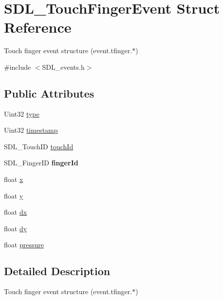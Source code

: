 \hypertarget{struct_s_d_l___touch_finger_event}{}\section{S\+D\+L\+\_\+\+Touch\+Finger\+Event Struct Reference}
\label{struct_s_d_l___touch_finger_event}


Touch finger event structure (event.\+tfinger.$\ast$)  




{\ttfamily \#include $<$S\+D\+L\+\_\+events.\+h$>$}

\subsection*{Public Attributes}
\begin{DoxyCompactItemize}
\item 
Uint32 \mbox{\hyperlink{struct_s_d_l___touch_finger_event_a3883218fa3426065ca66086c100edbfa}{type}}
\item 
Uint32 \mbox{\hyperlink{struct_s_d_l___touch_finger_event_abde2ab5cb013bbd21e37a65e2f8fa666}{timestamp}}
\item 
S\+D\+L\+\_\+\+Touch\+ID \mbox{\hyperlink{struct_s_d_l___touch_finger_event_ad7a6f39ec9af1bf47b160d18314edd70}{touch\+Id}}
\item 
\mbox{\label{struct_s_d_l___touch_finger_event_a8616d46ed19906e3ee90a4d481d3a284}} 
S\+D\+L\+\_\+\+Finger\+ID {\bfseries finger\+Id}
\item 
float \mbox{\hyperlink{struct_s_d_l___touch_finger_event_a0ce44b1342220fa17e9b9b4a77c2c906}{x}}
\item 
float \mbox{\hyperlink{struct_s_d_l___touch_finger_event_ac2bb8af638d2927a8e13f6ffe8f9384e}{y}}
\item 
float \mbox{\hyperlink{struct_s_d_l___touch_finger_event_ac6acac209d6e2bd659fdb6760081393d}{dx}}
\item 
float \mbox{\hyperlink{struct_s_d_l___touch_finger_event_a9c0320c5f18a6b9d10da657e166608c9}{dy}}
\item 
float \mbox{\hyperlink{struct_s_d_l___touch_finger_event_ab4fca822d0807b5748dbae8d3cc56524}{pressure}}
\end{DoxyCompactItemize}


\subsection{Detailed Description}
Touch finger event structure (event.\+tfinger.$\ast$) 

